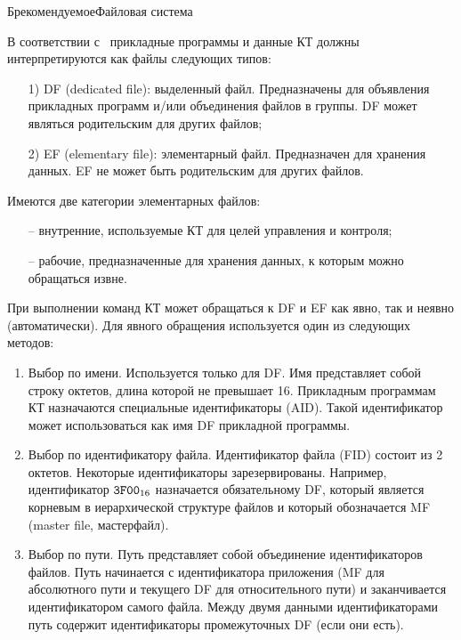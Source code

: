 \begin{appendix}{Б}{рекомендуемое}{Файловая система}
\label{FILES}


В соответствии с~\cite{APDU} прикладные программы и данные КТ должны 
интерпретируются как файлы следующих типов: 

\begin{enumerate}
\item[1)]
DF (dedicated file): выделенный файл. 
Предназначены для объявления прикладных программ и/или объединения файлов в 
группы. DF может являться родительским для других файлов;

\item[2)]
EF (elementary file): элементарный файл. Предназначен для хранения данных. 
EF не может быть родительским для других файлов.  
\end{enumerate}

Имеются две категории элементарных файлов:
\begin{itemize}
\item[--] 
внутренние, используемые КТ для целей управления и контроля;  
\item[--]
рабочие, предназначенные для хранения данных, к которым можно обращаться извне.
\end{itemize}                                                            
                  
При выполнении команд КТ может обращаться к DF и EF как явно, так и неявно 
(автоматически). Для явного обращения используется один из следующих 
методов: 
\begin{enumerate}
\item
Выбор по имени. Используется только для DF. Имя представляет собой строку 
октетов, длина которой не превышает 16. Прикладным программам КТ назначаются  
специальные идентификаторы (AID). Такой идентификатор может использоваться 
как имя DF прикладной программы. 

\item
Выбор по идентификатору файла. Идентификатор файла (FID) состоит из 2 октетов. 
Некоторые идентификаторы зарезервированы. Например, 
идентификатор $\texttt{3F00}_{16}$ назначается обязательному DF, 
который является корневым в иерархической структуре файлов и 
который обозначается MF (master file, мастерфайл). 

\item
Выбор по пути. Путь представляет собой объединение идентификаторов файлов. Путь 
начинается с идентификатора приложения (MF для абсолютного пути и текущего DF 
для относительного пути) и заканчивается идентификатором самого файла. Между 
двумя данными идентификаторами путь содержит идентификаторы промежуточных 
DF (если они есть). 


\end{enumerate}
\end{appendix}
